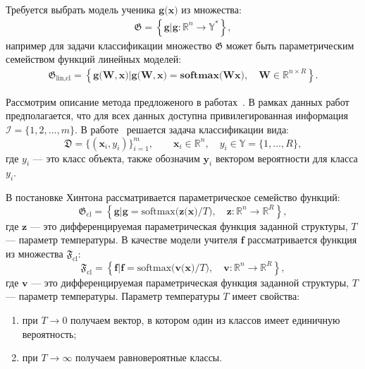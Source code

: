 Требуется выбрать модель ученика $\mathbf{g}\bigr(\mathbf{x}\bigr)$ из множества:
\[
\label{eq:st:G}
\begin{aligned}
\mathfrak{G} = \left\{\mathbf{g}| \mathbf{g}:\mathbb{R}^{n} \to \mathbb{Y}^*\right\},
\end{aligned}
\]
например для задачи классификации множество $\mathfrak{G}$ может быть параметрическим семейством функций линейных моделей:
\[
\label{eq:st:G:lin:cl}
\begin{aligned}
\mathfrak{G}_\text{lin,cl} = \left\{\mathbf{g}\bigr(\mathbf{W}, \mathbf{x}\bigr)| \mathbf{g}\bigr(\mathbf{W}, \mathbf{x}\bigr) = \textbf{softmax}\bigr(\mathbf{W}\mathbf{x}\bigr), \quad \mathbf{W} \in \mathbb{R}^{n\times R}\right\}.
\end{aligned}
\]

Рассмотрим описание метода предложеного в работах~\cite{Hinton2015, Lopez2016}. В рамках данных работ предполагается, что для всех данных доступна привилегированная информация $\mathcal{I} = \{1, 2, \ldots, m\}$. В работе~\cite{Hinton2015} решается задача классификации вида:
\[
    \mathfrak{D} = \{\left(\mathbf{x}_i, y_i\right)\}_{i=1}^{m}, \qquad \mathbf{x}_i \in \mathbb{R}^{n}, \quad y_i \in \mathbb{Y}=\{1, \ldots, R\},
\]
где $y_i$ --- это класс объекта, также обозначим $\mathbf{y}_i$ вектором вероятности для класса $y_i$.

В постановке Хинтона рассматривается параметрическое семейство функций:
\[
\label{eq:G:set:cl}
\mathfrak{G}_{\text{cl}} = \left\{\mathbf{g}| \mathbf{g} = \text{softmax}\bigr(\mathbf{z}\bigr(\mathbf{x}\bigr)/T\bigr), \quad \mathbf{z}: \mathbb{R}^n \to \mathbb{R}^R \right\},
\]
где $\mathbf{z}$ --- это дифференцируемая параметрическая функция заданной структуры, $T$ --- параметр температуры. В качестве модели учителя $\mathbf{f}$ рассматривается функция из множества $\mathfrak{F}_{\text{cl}}$:
\[
\label{eq:F:set:cl}
\mathfrak{F}_{\text{cl}} = \left\{\mathbf{f}| \mathbf{f} = \text{softmax}\bigr(\mathbf{v}\bigr(\mathbf{x}\bigr)/T\bigr), \quad \mathbf{v}: \mathbb{R}^n \to \mathbb{R}^R \right\},
\]
где $\mathbf{v}$ --- это дифференцируемая параметрическая функция заданной структуры, $T$ --- параметр температуры.
Параметр температуры $T$ имеет свойства:
\begin{enumerate}
    \item при $T\to 0$ получаем вектор, в котором один из классов имеет единичную вероятность;
    \item при $T\to \infty$ получаем равновероятные классы.
\end{enumerate}

